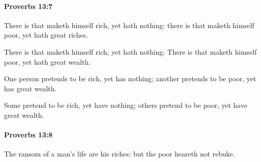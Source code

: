 		\paragraph{Proverbs 13:7} %
			\label{PROVERBS-13-7}

			There is that maketh himself rich, yet hath nothing: there is that maketh himself poor, yet hath great riches.

			\begin{versebox}
					\item[BHS] 
					\item[ASV] There is that maketh himself rich, yet hath nothing: There is that maketh himself poor, yet hath great wealth.
					\item[NIV] One person pretends to be rich, yet has nothing; another pretends to be poor, yet has great wealth.
					\item[NRSV] Some pretend to be rich, yet have nothing; others pretend to be poor, yet have great wealth.
			\end{versebox}

		\paragraph{Proverbs 13:8} %
			\label{PROVERBS-13-8}

			The ransom of a man’s life are his riches: but the poor heareth not rebuke.

